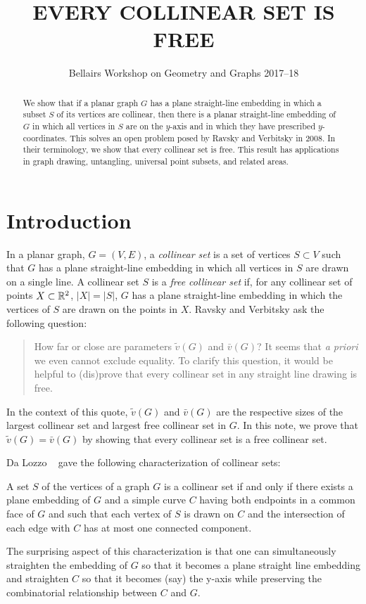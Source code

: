 \documentclass{patmorin}
\title{\MakeUppercase{Every Collinear Set is Free}}
\author{Bellairs Workshop on Geometry and Graphs 2017--18}
\begin{document}
\maketitle


\begin{abstract}
  We show that if a planar graph $G$ has a plane straight-line embedding
  in which a subset $S$ of its vertices are collinear, then there is a
  planar straight-line embedding of $G$ in which all vertices in $S$ are
  on the $y$-axis and in which they have prescribed $y$-coordinates.
  This solves an open problem posed by Ravsky and Verbitsky in 2008.
  In their terminology, we show that every collinear set is free.
  This result has applications in graph drawing, untangling, universal
  point subsets, and related areas.
\end{abstract}


\section{Introduction}

In a planar graph, $G=(V,E)$, a \emph{collinear set} is a set of vertices
$S\subset V$ such that $G$ has a plane straight-line embedding in which
all vertices in $S$ are drawn on a single line.  A collinear set $S$
is a \emph{free collinear set} if, for any collinear set of points
$X\subset\mathbb{R}^2$, $|X|=|S|$, $G$ has a plane straight-line embedding in
which the vertices of $S$ are drawn on the points in $X$.  Ravsky and
Verbitsky \cite{ravsky.verbitsky:on,ravsky.verbitsky:on-arxiv} ask the
following question:

\begin{quote}
   How far or close are parameters $\tilde{v}(G)$ and $\bar{v}(G)$? It
   seems that \emph{a priori} we even cannot exclude equality. To clarify
   this question, it would be helpful to (dis)prove that every collinear
   set in any straight line drawing is free.
\end{quote}

In the context of this quote, $\tilde{v}(G)$ and $\bar{v}(G)$ are the
respective sizes of the largest collinear set and largest free collinear
set in $G$.  In this note, we prove that $\tilde{v}(G)=\bar{v}(G)$ by
showing that every collinear set is a free collinear set.  

Da Lozzo \etal\ \cite{dalozzo.dujmovic.ea:drawing}
gave the following characterization of collinear sets:
\begin{thm}
   A set $S$ of the vertices of a graph $G$ is a collinear set if and
   only if there exists a plane embedding of $G$ and a simple curve
   $C$ having both endpoints in a common face of $G$ and such that each
   vertex of $S$ is drawn on $C$ and the intersection of each edge with
   $C$ has at most one connected component.
\end{thm}
The surprising aspect of this characterization is that one can
simultaneously straighten the embedding of $G$ so that it becomes
a plane straight line embedding and straighten $C$ so that it becomes (say)
the y-axis while preserving the combinatorial relationship between $C$
and $G$.
\end{document}
